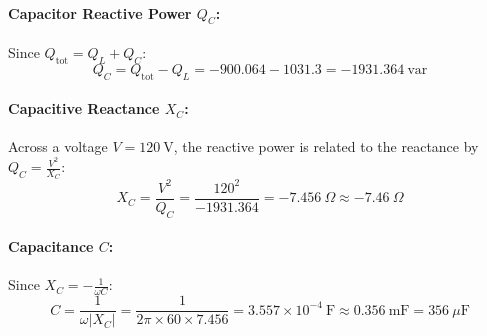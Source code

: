 \paragraph{Capacitor Reactive Power $Q_C$:}
Since $Q_{\text{tot}} = Q_L + Q_C$:
\begin{equation}
    Q_C = Q_{\text{tot}} - Q_L = -900.064 - 1031.3 = -1931.364\ \text{var}
\end{equation}

\paragraph{Capacitive Reactance $X_C$:}
Across a voltage $V = 120\ \text{V}$, the reactive power is related to the reactance by $Q_C = \frac{V^2}{X_C}$:
\begin{equation}
    \boxed{X_C = \frac{V^2}{Q_C} = \frac{120^2}{-1931.364} = -7.456\ \Omega \approx -7.46\ \Omega}
\end{equation}

\paragraph{Capacitance $C$:}
Since $X_C = -\frac{1}{\omega C}$:
\begin{equation}
    \boxed{C = \frac{1}{\omega |X_C|} = \frac{1}{2\pi \times 60 \times 7.456} = 3.557 \times 10^{-4}\ \text{F} \approx 0.356\ \text{mF} = 356\ \mu\text{F}}
\end{equation}
